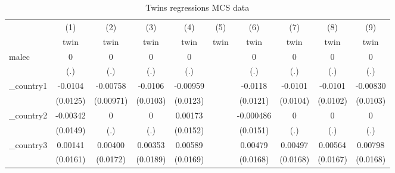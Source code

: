 \begin{table}[htbp]\centering
\def\sym#1{\ifmmode^{#1}\else\(^{#1}\)\fi}
\caption{Twins regressions MCS data}
\begin{tabular}{l*{9}{c}}
\hline\hline
            &\multicolumn{1}{c}{(1)}&\multicolumn{1}{c}{(2)}&\multicolumn{1}{c}{(3)}&\multicolumn{1}{c}{(4)}&\multicolumn{1}{c}{(5)}&\multicolumn{1}{c}{(6)}&\multicolumn{1}{c}{(7)}&\multicolumn{1}{c}{(8)}&\multicolumn{1}{c}{(9)}\\
            &\multicolumn{1}{c}{twin}&\multicolumn{1}{c}{twin}&\multicolumn{1}{c}{twin}&\multicolumn{1}{c}{twin}&\multicolumn{1}{c}{twin}&\multicolumn{1}{c}{twin}&\multicolumn{1}{c}{twin}&\multicolumn{1}{c}{twin}&\multicolumn{1}{c}{twin}\\
\hline
malec       &           0         &           0         &           0         &           0         &                     &           0         &           0         &           0         &           0         \\
            &         (.)         &         (.)         &         (.)         &         (.)         &                     &         (.)         &         (.)         &         (.)         &         (.)         \\
[1em]
\_country1   &     -0.0104         &    -0.00758         &     -0.0106         &    -0.00959         &                     &     -0.0118         &     -0.0101         &     -0.0101         &    -0.00830         \\
            &    (0.0125)         &   (0.00971)         &    (0.0103)         &    (0.0123)         &                     &    (0.0121)         &    (0.0104)         &    (0.0102)         &    (0.0103)         \\
[1em]
\_country2   &    -0.00342         &           0         &           0         &     0.00173         &                     &   -0.000486         &           0         &           0         &           0         \\
            &    (0.0149)         &         (.)         &         (.)         &    (0.0152)         &                     &    (0.0151)         &         (.)         &         (.)         &         (.)         \\
[1em]
\_country3   &     0.00141         &     0.00400         &     0.00353         &     0.00589         &                     &     0.00479         &     0.00497         &     0.00564         &     0.00798         \\
            &    (0.0161)         &    (0.0172)         &    (0.0189)         &    (0.0169)         &                     &    (0.0168)         &    (0.0168)         &    (0.0167)         &    (0.0168)         \\

\end{tabular}
\end{table}
